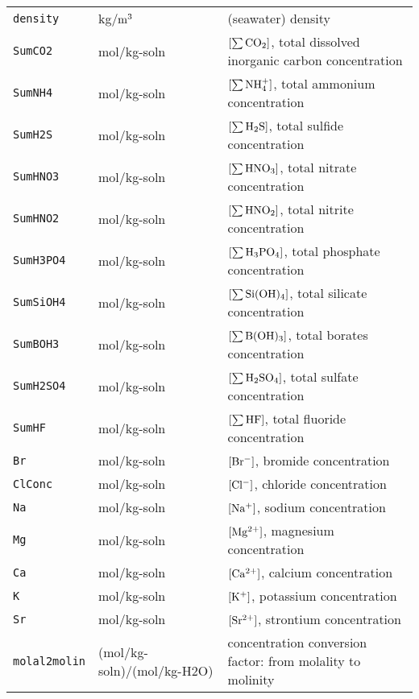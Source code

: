 \documentclass[article,nojss]{jss}
\begin{document}
\begin{footnotesize}
\begin{longtable}{l|l|p{7cm}}
\texttt{density}     & kg/$\rm m^3$                 & (seawater) density   \\
\texttt{SumCO2}      & mol/kg-soln                  & $[\rm \sum CO_2]$, total dissolved inorganic carbon concentration \\         
\texttt{SumNH4}      & mol/kg-soln                  & $[\rm \sum NH_4^+]$, total ammonium concentration\\
\texttt{SumH2S}      & mol/kg-soln                  & $[\rm \sum H_2S]$, total sulfide concentration\\
\texttt{SumHNO3}     & mol/kg-soln                  & $[\rm \sum HNO_3]$, total nitrate concentration\\
\texttt{SumHNO2}     & mol/kg-soln                  & $[\rm \sum HNO_2]$, total nitrite concentration\\
\texttt{SumH3PO4}    & mol/kg-soln                  & $[\rm \sum H_3PO_4]$, total phosphate concentration\\
\texttt{SumSiOH4}    & mol/kg-soln                  & $[\rm \sum Si(OH)_4]$, total silicate concentration\\       
\texttt{SumBOH3}     & mol/kg-soln                  & $[\rm \sum B(OH)_3]$, total borates concentration\\
\texttt{SumH2SO4}    & mol/kg-soln                  & $[\rm \sum H_2SO_4]$, total sulfate concentration\\
\texttt{SumHF}       & mol/kg-soln                  & $[\rm \sum HF]$, total fluoride concentration\\
\texttt{Br}          & mol/kg-soln                  & $[\rm Br^-]$, bromide concentration\\
\texttt{ClConc}      & mol/kg-soln                  & $[\rm Cl^-]$, chloride concentration\\
\texttt{Na}          & mol/kg-soln                  & $[\rm Na^{+}]$, sodium concentration\\
\texttt{Mg}          & mol/kg-soln                  & $[\rm Mg^{2+}]$, magnesium concentration\\
\texttt{Ca}          & mol/kg-soln                  & $[\rm Ca^{2+}]$, calcium concentration\\
\texttt{K}           & mol/kg-soln                  & $[\rm K^+]$, potassium concentration\\               
\texttt{Sr}          & mol/kg-soln                  & $[\rm Sr^{2+}]$, strontium concentration\\    
\texttt{molal2molin} & (mol/kg-soln)/(mol/kg-H2O)   & concentration conversion factor: from molality to molinity\\

\end{longtable}
\end{footnotesize}
\end{document}

